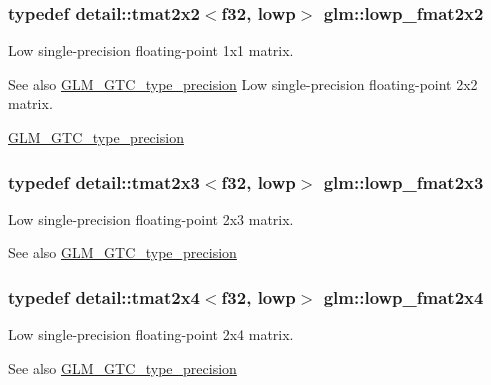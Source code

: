 \subsubsection[{\texorpdfstring{lowp\+\_\+fmat2x2}{lowp_fmat2x2}}]{\setlength{\rightskip}{0pt plus 5cm}typedef detail\+::tmat2x2$<$f32, lowp$>$ {\bf glm\+::lowp\+\_\+fmat2x2}}\hypertarget{group__gtc__type__precision_ga99367a30c64035d7e7f76410105d10e3}{}\label{group__gtc__type__precision_ga99367a30c64035d7e7f76410105d10e3}
Low single-\/precision floating-\/point 1x1 matrix. \begin{DoxySeeAlso}{See also}
\hyperlink{group__gtc__type__precision}{G\+L\+M\+\_\+\+G\+T\+C\+\_\+type\+\_\+precision} Low single-\/precision floating-\/point 2x2 matrix. 

\hyperlink{group__gtc__type__precision}{G\+L\+M\+\_\+\+G\+T\+C\+\_\+type\+\_\+precision} 
\end{DoxySeeAlso}
\subsubsection[{\texorpdfstring{lowp\+\_\+fmat2x3}{lowp_fmat2x3}}]{\setlength{\rightskip}{0pt plus 5cm}typedef detail\+::tmat2x3$<$f32, lowp$>$ {\bf glm\+::lowp\+\_\+fmat2x3}}\hypertarget{group__gtc__type__precision_ga01c5c29a6cee22c3e75de25c98dbecc9}{}\label{group__gtc__type__precision_ga01c5c29a6cee22c3e75de25c98dbecc9}
Low single-\/precision floating-\/point 2x3 matrix. \begin{DoxySeeAlso}{See also}
\hyperlink{group__gtc__type__precision}{G\+L\+M\+\_\+\+G\+T\+C\+\_\+type\+\_\+precision} 
\end{DoxySeeAlso}
\subsubsection[{\texorpdfstring{lowp\+\_\+fmat2x4}{lowp_fmat2x4}}]{\setlength{\rightskip}{0pt plus 5cm}typedef detail\+::tmat2x4$<$f32, lowp$>$ {\bf glm\+::lowp\+\_\+fmat2x4}}\hypertarget{group__gtc__type__precision_ga14b4460b2132fd3db19b53ec6f9353f2}{}\label{group__gtc__type__precision_ga14b4460b2132fd3db19b53ec6f9353f2}
Low single-\/precision floating-\/point 2x4 matrix. \begin{DoxySeeAlso}{See also}
\hyperlink{group__gtc__type__precision}{G\+L\+M\+\_\+\+G\+T\+C\+\_\+type\+\_\+precision} 
\end{DoxySeeAlso}
